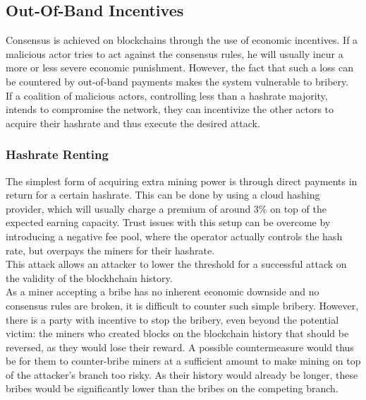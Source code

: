 \documentclass[12pt,a4paper]{article}
\begin{document}
\subsection{Out-Of-Band Incentives}

Consensus is achieved on \gls{blockchain}s through the use of economic incentives. If a malicious actor tries to act against the consensus rules, he will usually incur a more or less severe economic punishment. However, the fact that such a loss can be countered by out-of-band payments makes the system vulnerable to bribery.\\

If a coalition of malicious actors, controlling less than a \gls{hashrate} majority, intends to compromise the network, they can incentivize the other actors to acquire their \gls{hashrate} and thus execute the desired attack.\\

\subsubsection{Hashrate Renting}

The simplest form of acquiring extra mining power is through direct payments in return for a certain \gls{hashrate}. This can be done by using a cloud hashing provider, which will usually charge a premium of around 3\% on top of the expected earning capacity. Trust issues with this setup can be overcome by introducing a negative fee \gls{pool}, where the operator actually controls the hash rate, but overpays the miners for their \gls{hashrate}.\\

This attack allows an attacker to lower the threshold for a successful attack on the validity of the blockhchain history.\\

As a miner accepting a bribe has no inherent economic downside and no consensus rules are broken, it is difficult to counter such simple bribery. However, there is a party with incentive to stop the bribery, even beyond the potential victim: the miners who created blocks on the blockchain history that should be reversed, as they would lose their reward. A possible countermeasure would thus be for them to counter-bribe miners at a sufficient amount to make mining on top of the attacker's branch too risky. As their history would already be longer, these bribes would be significantly lower than the bribes on the competing branch.\\
\end{document}
